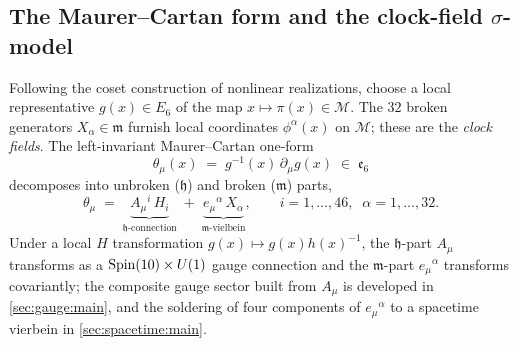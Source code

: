 \subsection{The Maurer--Cartan form and the clock-field \texorpdfstring{$\sigma$}{sigma}-model}
\label{sec:coset:sigma}

Following the coset construction of nonlinear realizations, choose a local
representative $g(x)\in E_{6}$ of the map $x\mapsto\pi(x)\in\mathcal M$. The
$32$ broken generators $X_{\alpha}\in\mathfrak m$ furnish local coordinates
$\phi^{\alpha}(x)$ on $\mathcal M$; these are the \emph{clock fields}. The
left-invariant Maurer--Cartan one-form
\begin{equation}\label{eq:coset:MC}
  \theta_{\mu}(x) \;=\; g^{-1}(x)\,\partial_{\mu}g(x)\;\in\;\mathfrak e_{6}
\end{equation}
decomposes into unbroken ($\mathfrak h$) and broken ($\mathfrak m$) parts,
\begin{equation}\label{eq:coset:MCsplit}
  \theta_{\mu}
   \;=\; \underbrace{A_{\mu}{}^{i}\,H_{i}}_{\mathfrak h\text{-connection}}
        \;+\;
         \underbrace{e_{\mu}{}^{\alpha}\,X_{\alpha}}_{\mathfrak m\text{-vielbein}},
  \qquad i = 1,\dots,46,\;\; \alpha = 1,\dots,32 .
\end{equation}
Under a local $H$ transformation $g(x)\mapsto g(x)h(x)^{-1}$, the $\mathfrak
h$-part $A_{\mu}$ transforms as a $\operatorname{Spin}(10)\times U(1)$ gauge connection and the
$\mathfrak m$-part $e_{\mu}{}^{\alpha}$ transforms covariantly; the composite
gauge sector built from $A_{\mu}$ is developed in \autoref{sec:gauge:main}, and the
soldering of four components of $e_{\mu}{}^{\alpha}$ to a spacetime vierbein in
\autoref{sec:spacetime:main}.

